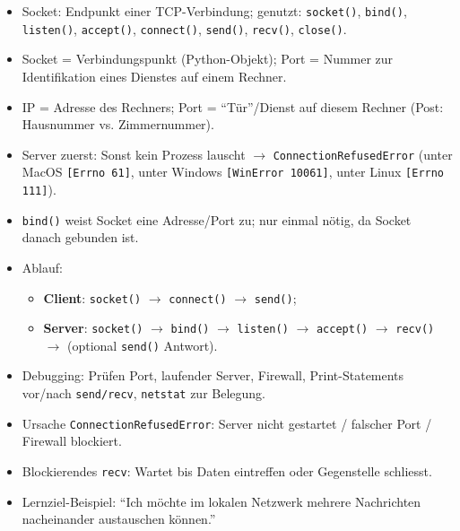 \begin{myexercise}[Reflexionsfragen]
    \begin{myanswer}
        \begin{itemize}
            \item Socket: Endpunkt einer \gls{TCP}-Verbindung; genutzt: \texttt{socket()}, \texttt{bind()}, \texttt{listen()}, \texttt{accept()}, \texttt{connect()}, \texttt{send()}, \texttt{recv()}, \texttt{close()}.
            \item Socket = Verbindungspunkt (Python-Objekt); Port = Nummer zur Identifikation eines Dienstes auf einem Rechner.
            \item \gls{IP} = Adresse des Rechners; Port = \enquote{Tür}/Dienst auf diesem Rechner (Post: Hausnummer vs. Zimmernummer).
            \item Server zuerst: Sonst kein Prozess lauscht $\rightarrow$ \texttt{ConnectionRefusedError} (unter MacOS \texttt{[Errno 61]}, unter Windows \texttt{[WinError 10061]}, unter Linux \texttt{[Errno 111]}).
            \item \texttt{bind()} weist Socket eine Adresse/Port zu; nur einmal nötig, da Socket danach gebunden ist.
            \item Ablauf:
                  \begin{itemize}
                      \item \textbf{Client}: \texttt{socket()} $\rightarrow$ \texttt{connect()} $\rightarrow$ \texttt{send()};
                      \item \textbf{Server}: \texttt{socket()} $\rightarrow$ \texttt{bind()} $\rightarrow$ \texttt{listen()} $\rightarrow$ \texttt{accept()} $\rightarrow$ \texttt{recv()} $\rightarrow$ (optional \texttt{send()} Antwort).
                  \end{itemize}

            \item Debugging: Prüfen Port, laufender Server, Firewall, Print-Statements vor/nach \texttt{send/recv}, \texttt{netstat} zur Belegung.
            \item Ursache \texttt{ConnectionRefusedError}: Server nicht gestartet / falscher Port / Firewall blockiert.
            \item Blockierendes \texttt{recv}: Wartet bis Daten eintreffen oder Gegenstelle schliesst.
            \item Lernziel-Beispiel: \enquote{Ich möchte im lokalen Netzwerk mehrere Nachrichten nacheinander austauschen können.}
        \end{itemize}
    \end{myanswer}
\end{myexercise}

